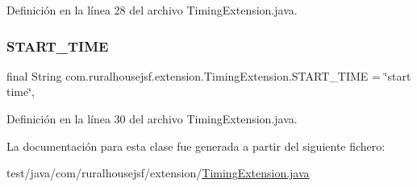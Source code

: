 Definición en la línea 28 del archivo Timing\+Extension.\+java.

\mbox{\label{a00268_ad283289939c7b6e42277a8b06db6a765}} 
\subsubsection{\texorpdfstring{START\_TIME}{START\_TIME}}
{\footnotesize\ttfamily final String com.\+ruralhousejsf.\+extension.\+Timing\+Extension.\+S\+T\+A\+R\+T\+\_\+\+T\+I\+ME = \char`\"{}start time\char`\"{}\hspace{0.3cm}{\ttfamily [static]}, {\ttfamily [private]}}



Definición en la línea 30 del archivo Timing\+Extension.\+java.



La documentación para esta clase fue generada a partir del siguiente fichero\+:\begin{DoxyCompactItemize}
\item 
test/java/com/ruralhousejsf/extension/\mbox{\hyperlink{a00098}{Timing\+Extension.\+java}}\end{DoxyCompactItemize}
